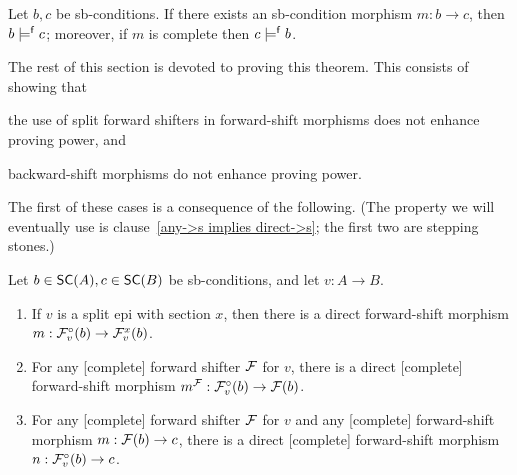 \begin{theorem}
Let $b,c$ be sb-conditions. If there exists an sb-condition morphism $m:b\to c$, then $b\pentails c$; moreover, if $m$ is complete then $c\pentails b$.
\end{theorem}
%
The rest of this section is devoted to proving this theorem. This consists of showing that
\begin{inumerate}
\item the use of split forward shifters in forward-shift morphisms does not enhance proving power, and 
\item backward-shift morphisms do not enhance proving power.
\end{inumerate}
%
The first of these cases is a consequence of the following. (The property we will eventually use is clause~\ref{any->s implies direct->s}; the first two are stepping stones.)

\begin{lemma}
Let $b\in \SC A,c\in \SC B$ be sb-conditions, and let $v:A\to B$.
\begin{enumerate}[topsep=\smallskipamount]
\item\label{direct->split} If $v$ is a split epi with section $x$, then there is a direct forward-shift morphism $m:\dF v(b)\to \rF v x(b)$.
\item\label{direct->any} For any [complete] forward shifter $\cF$ for $v$, there is a direct [complete] forward-shift morphism $m^\cF:\dF v(b)\to \cF(b)$.
\item\label{any->s implies direct->s} For any [complete] forward shifter $\cF$ for $v$ and any [complete] forward-shift morphism $m:\cF(b)\to c$, there is a direct [complete] forward-shift morphism $n:\dF v(b)\to c$.
\end{enumerate}
\end{lemma}

